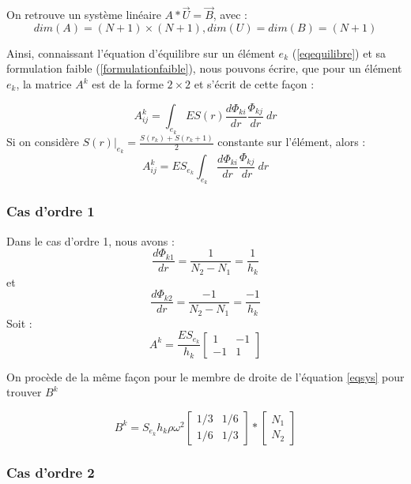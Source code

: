 \documentclass[a4paper,10pt]{report} %
\begin{document}
On retrouve un système linéaire $A*\vec{U}=\vec{B}$, avec :
$$dim (A) = (N+1)\times(N+1), dim (U)=dim(B)=(N+1)$$

Ainsi, connaissant l'équation d'équilibre sur un élément $e_k$ (\ref{eqequilibre}) et sa formulation faible (\ref{formulationfaible}), nous pouvons écrire, que pour un élément $e_k$, la matrice $A^k$ est de la forme $2\times2$ et s'écrit de cette façon :

\begin{equation}
	A^k_{ij}=\int_{e_k} \!ES(r)\frac{d\Phi_{ki}}{dr}\frac{\Phi_{kj}}{dr}~dr
\end{equation}
Si on considère $S(r)|_{e_k}=\frac{S(r_k)+S(r_k+1)}{2}$ constante sur l'élément, alors :
\begin{equation}
	A^k_{ij}=ES_{e_k} \int_{e_k} \frac{d\Phi_{ki}}{dr}\frac{\Phi_{kj}}{dr}~dr
	\label{matrixA}
\end{equation}



\subsubsection{Cas d'ordre 1}
Dans le cas d'ordre 1, nous avons :
	$$\frac{d\Phi_{k1}}{dr}=\frac{1}{N_2-N_1}=\dfrac{1}{h_k}$$
	et
	$$\frac{d\Phi_{k2}}{dr}=\frac{-1}{N_2-N_1}=\dfrac{-1}{h_k}$$
Soit :
\begin{equation}
	A^k=\frac{ES_{e_k}}{h_k}\begin{bmatrix}
    1 & -1 \\
    -1 & 1
  \end{bmatrix}
\end{equation}
	
On procède de la même façon pour le membre de droite de l'équation \ref{eqsys} pour trouver $B^k$

\begin{equation}
	B^k = S_{e_k}h_k\rho\omega^2 \begin{bmatrix}
    1/3 & 1/6 \\
    1/6 & 1/3
  \end{bmatrix}*
\begin{bmatrix}
    N_1 \\
    N_2 
  \end{bmatrix}  
\end{equation}
\subsubsection{Cas d'ordre 2}

\end{document}
